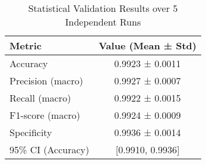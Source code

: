 
\begin{table}[htbp]
\centering
\caption{Statistical Validation Results over 5 Independent Runs}
\label{tab:statistical_validation}
\begin{tabular}{lc}
\hline
\textbf{Metric} & \textbf{Value (Mean ± Std)} \\
\hline
Accuracy & 0.9923 ± 0.0011 \\
Precision (macro) & 0.9927 ± 0.0007 \\
Recall (macro) & 0.9922 ± 0.0015 \\
F1-score (macro) & 0.9924 ± 0.0009 \\
Specificity & 0.9936 ± 0.0014 \\
\hline
95\% CI (Accuracy) & [0.9910, 0.9936] \\
\hline
\end{tabular}
\end{table}
